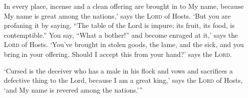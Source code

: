 \begin{inparaenum}
    \noindent In every place, incense and a clean offering are brought in to My name, because My name is great among the nations,' says the \textsc{Lord} of Hosts.%
     `But you are profaning it by saying, ``The table of the Lord is impure; its fruit, its food, is contemptible.''%
     You say, ``What a bother!'' and become enraged at it,' says the \textsc{Lord} of Hosts. `You've brought in stolen goods, the lame, and the sick, and you bring in your offering. Should I accept this from your hand?' says the \textsc{Lord}.%
    
     `Cursed is the deceiver who has a male in his flock and vows and sacrifices a defective thing to the Lord, because I am a great king,' says the \textsc{Lord} of Hosts, `and My name is revered among the nations.'\thinspace''%
\end{inparaenum}
